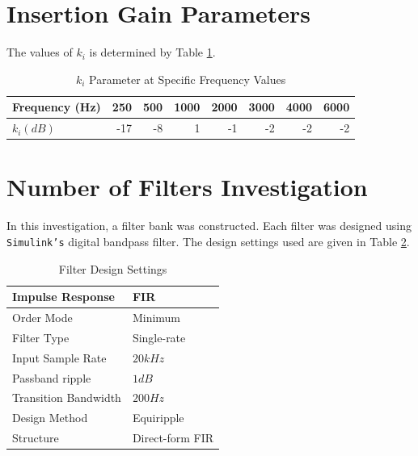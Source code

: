 \documentclass[11pt,onecolumn]{witseiepaper}
\begin{document}
\begin{appendices}
\section{Insertion Gain Parameters}
\label{app:insertGainParam}

\noindent The values of $k_i$ is determined by Table \ref{tab:kiVal}.

\begin{table}[htbp]
  \centering
  \caption{$k_i$ Parameter at Specific Frequency Values}
    \begin{tabular}{|l|r|r|r|r|r|r|r|}
    \hline
    \textbf{Frequency (Hz)} & 250   & 500   & 1000  & 2000  & 3000  & 4000  & 6000 \\
    \hline
    \textbf{$k_i (dB)$} & -17   & -8    & 1     & -1    & -2    & -2    & -2 \\
    \hline
    \end{tabular}%
  \label{tab:kiVal}%
\end{table}%


\section{Number of Filters Investigation}
\label{app:numFilt}

\noindent In this investigation, a filter bank was constructed. Each filter was designed using \texttt{Simulink's} digital bandpass filter. The design settings used are given in Table \ref{tab:numFilt_FiltSpec}.

\begin{table}[htbp]
  \centering
  \caption{Filter Design Settings}
  
    \begin{tabular}{|l|l|}
    \hline
    Impulse Response  & FIR  \\
    \hline
    Order Mode & Minimum \\
    \hline
    Filter Type & Single-rate \\
    \hline
    Input Sample Rate & $20kHz$ \\
    \hline
    Passband ripple & $1dB$ \\
    \hline
    Transition Bandwidth & $200Hz$ \\
    \hline
    Design Method & Equiripple \\
    \hline
    Structure  & Direct-form FIR \\
    \hline
    \end{tabular}%
  \label{tab:numFilt_FiltSpec}%
\end{table}%


\end{appendices}
\end{document}
